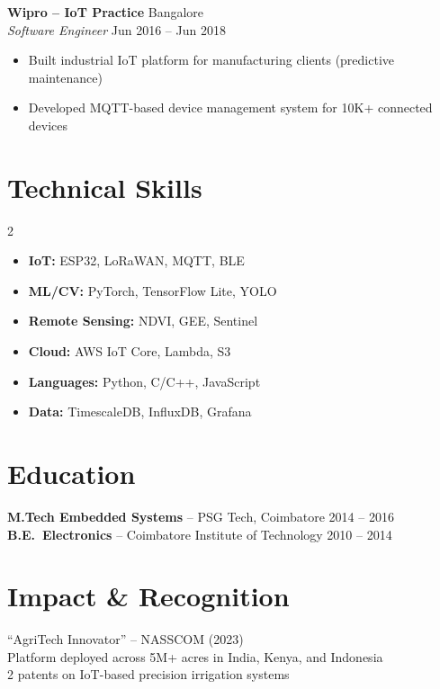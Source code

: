 \documentclass[11pt,letterpaper]{article}
\begin{document}
\textbf{Wipro -- IoT Practice} \hfill Bangalore\\
\textit{Software Engineer} \hfill Jun 2016 -- Jun 2018
\begin{itemize}
\item Built industrial IoT platform for manufacturing clients (predictive maintenance)
\item Developed MQTT-based device management system for 10K+ connected devices
\end{itemize}

\section{Technical Skills}
\begin{multicols}{2}
\begin{itemize}[label=\color{olive}]
\item \textbf{IoT:} ESP32, LoRaWAN, MQTT, BLE
\item \textbf{ML/CV:} PyTorch, TensorFlow Lite, YOLO
\item \textbf{Remote Sensing:} NDVI, GEE, Sentinel
\item \textbf{Cloud:} AWS IoT Core, Lambda, S3
\item \textbf{Languages:} Python, C/C++, JavaScript
\item \textbf{Data:} TimescaleDB, InfluxDB, Grafana
\end{itemize}
\end{multicols}

\section{Education}
\textbf{M.Tech Embedded Systems} -- PSG Tech, Coimbatore \hfill 2014 -- 2016\\
\textbf{B.E.\ Electronics} -- Coimbatore Institute of Technology \hfill 2010 -- 2014

\section{Impact \& Recognition}
\hspace{4pt} ``AgriTech Innovator'' -- NASSCOM (2023)\\
\hspace{4pt} Platform deployed across 5M+ acres in India, Kenya, and Indonesia\\
\hspace{4pt} 2 patents on IoT-based precision irrigation systems
\end{document}
